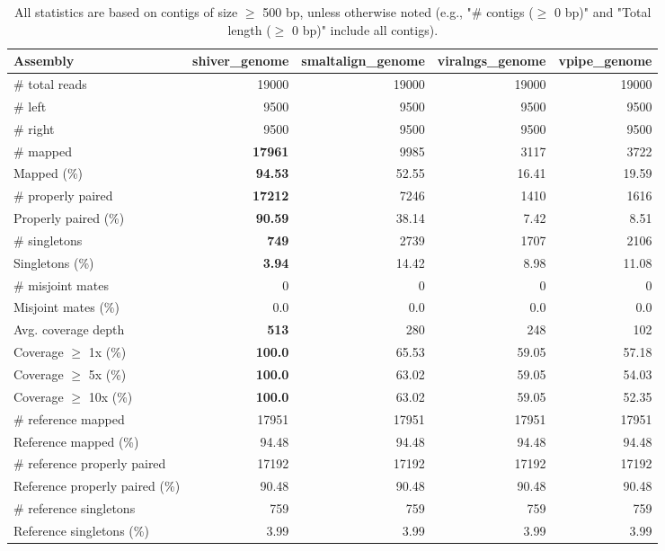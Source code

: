\documentclass[12pt,a4paper]{article}
\begin{document}
\begin{table}[ht]
\begin{center}
\caption{All statistics are based on contigs of size $\geq$ 500 bp, unless otherwise noted (e.g., "\# contigs ($\geq$ 0 bp)" and "Total length ($\geq$ 0 bp)" include all contigs).}
\begin{tabular}{|l*{4}{|r}|}
\hline
Assembly & shiver\_genome & smaltalign\_genome & viralngs\_genome & vpipe\_genome \\ \hline
\# total reads & 19000 & 19000 & 19000 & 19000 \\ \hline
\# left & 9500 & 9500 & 9500 & 9500 \\ \hline
\# right & 9500 & 9500 & 9500 & 9500 \\ \hline
\# mapped & {\bf 17961} & 9985 & 3117 & 3722 \\ \hline
Mapped (\%) & {\bf 94.53} & 52.55 & 16.41 & 19.59 \\ \hline
\# properly paired & {\bf 17212} & 7246 & 1410 & 1616 \\ \hline
Properly paired (\%) & {\bf 90.59} & 38.14 & 7.42 & 8.51 \\ \hline
\# singletons & {\bf 749} & 2739 & 1707 & 2106 \\ \hline
Singletons (\%) & {\bf 3.94} & 14.42 & 8.98 & 11.08 \\ \hline
\# misjoint mates & 0 & 0 & 0 & 0 \\ \hline
Misjoint mates (\%) & 0.0 & 0.0 & 0.0 & 0.0 \\ \hline
Avg. coverage depth & {\bf 513} & 280 & 248 & 102 \\ \hline
Coverage $\geq$ 1x (\%) & {\bf 100.0} & 65.53 & 59.05 & 57.18 \\ \hline
Coverage $\geq$ 5x (\%) & {\bf 100.0} & 63.02 & 59.05 & 54.03 \\ \hline
Coverage $\geq$ 10x (\%) & {\bf 100.0} & 63.02 & 59.05 & 52.35 \\ \hline
\# reference mapped & 17951 & 17951 & 17951 & 17951 \\ \hline
Reference mapped (\%) & 94.48 & 94.48 & 94.48 & 94.48 \\ \hline
\# reference properly paired & 17192 & 17192 & 17192 & 17192 \\ \hline
Reference properly paired (\%) & 90.48 & 90.48 & 90.48 & 90.48 \\ \hline
\# reference singletons & 759 & 759 & 759 & 759 \\ \hline
Reference singletons (\%) & 3.99 & 3.99 & 3.99 & 3.99 \\ \hline

\end{tabular}
\end{center}
\end{table}
\end{document}
